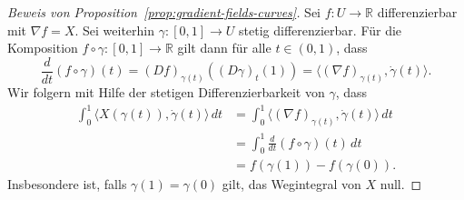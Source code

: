 \documentclass[../main.tex]{subfiles}
\begin{document}
\begin{proof}[Beweis von Proposition~\ref{prop:gradient-fields-curves}]
  Sei $f \colon U \to \mathbb{R}$ differenzierbar
  mit $\nabla f = X$.
  Sei weiterhin $\gamma \colon [0, 1] \to U$ stetig differenzierbar.
  Für die Komposition $f \circ \gamma \colon [0, 1] \to \mathbb{R}$ 
  gilt dann für alle $t \in (0, 1)$, dass
  \[
    \frac{d}{dt}(f \circ \gamma) (t)
    = {(Df)}_{\gamma(t)}({(D\gamma)}_t(1))
    = \langle {(\nabla f)}_{\gamma(t)}, \dot \gamma(t) \rangle.
  \]
  Wir folgern mit Hilfe der stetigen Differenzierbarkeit
  von $\gamma$, dass
  \begin{align*}
    \int_{0}^{1} \langle X(\gamma(t)), \dot \gamma(t) \rangle \, dt
    &= \int_{0}^{1} \langle {(\nabla f)}_{\gamma(t)}, 
    \dot \gamma(t) \rangle \, dt \\
    &= \int_{0}^{1} \frac{d}{dt} (f \circ \gamma)(t) \, dt  \\
    &= f(\gamma(1)) - f(\gamma(0)).
  \end{align*}
  Insbesondere ist, falls $\gamma(1) = \gamma(0)$ gilt, das Wegintegral
  von $X$ null.


\end{proof}
\end{document}
